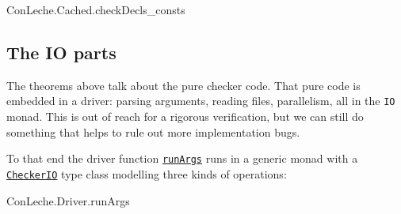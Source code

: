 \documentclass{article}
\newcommand\code[1]{\texttt{#1}}
\begin{document}
\begin{itemize}
\begin{leanblock}[view=lean, sum=B6mCq7hRr3]{ConLeche.Cached.checkDecls_consts}{}
\end{leanblock}

\end{itemize}

\subsection*{The IO parts}

The theorems above talk about the pure checker code. That pure code is embedded in a driver: parsing arguments, reading files, parallelism, all in the \code{IO} monad. This is out of reach for a rigorous verification, but we can still do something that helps to rule out more implementation bugs.

To that end the driver function \href{https://github.com/leanprover/con-leche/blob/master/ConLeche/Driver/Cli.lean#L446}{\code{runArgs}} runs in a generic monad with a \href{https://github.com/leanprover/con-leche/blob/master/ConLeche/Frontend/CheckerIO.lean#L120}{\code{CheckerIO}} type class modelling three kinds of operations:

\begin{leanblock}[view=lean, sum=gGO-WB3het]{ConLeche.Driver.runArgs}{}
\end{leanblock}
\end{document}

